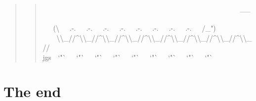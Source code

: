 \documentclass[10pt,a4paper,english]{article}
\begin{document}
\hspace*{\fill}\hrulefill\hspace*{\fill}

\begin{quote}
\begin{quote}{\ttfamily \raggedright \noindent
~~~~~~~~~~~~~~~~~~~~~~~~~~~~~~~~~~~~~~~~~~~~~~~~~~~~~~~~~{\_}{\_}~\\
~~~({\textbackslash}~~~.-.~~~.-.~~~.-.~~~.-.~~~.-.~~~.-.~~~.-.~~~.-.~~~/{\_}")~\\
~~~~{\textbackslash}{\textbackslash}{\_}//{\textasciicircum}{\textbackslash}{\textbackslash}{\_}//{\textasciicircum}{\textbackslash}{\textbackslash}{\_}//{\textasciicircum}{\textbackslash}{\textbackslash}{\_}//{\textasciicircum}{\textbackslash}{\textbackslash}{\_}//{\textasciicircum}{\textbackslash}{\textbackslash}{\_}//{\textasciicircum}{\textbackslash}{\textbackslash}{\_}//{\textasciicircum}{\textbackslash}{\textbackslash}{\_}//{\textasciicircum}{\textbackslash}{\textbackslash}{\_}//~\\
jgs~~`"`~~~`"`~~~`"`~~~`"`~~~`"`~~~`"`~~~`"`~~~`"`~~~`"`
}\end{quote}
\end{quote}



\hypertarget{the-end}{}
\section*{The end}
\end{document}
